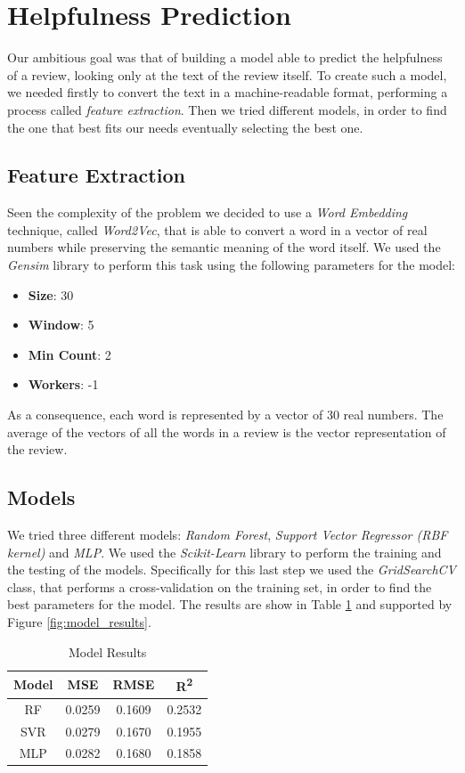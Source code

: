 \section{Helpfulness Prediction}
Our ambitious goal was that of building a model able to predict the helpfulness of a review, looking only at the text of the review itself.
To create such a model, we needed firstly to convert the text in a machine-readable format, performing a process called \textit{feature extraction}.
Then we tried different models, in order to find the one that best fits our needs eventually selecting the best one.

\subsection{Feature Extraction}
Seen the complexity of the problem we decided to use a \textit{Word Embedding} technique, called \textit{Word2Vec}, that is able to convert a word in a vector of real numbers
while preserving the semantic meaning of the word itself. We used the \textit{Gensim} library to perform this task using the following parameters for the model:
\begin{itemize}[noitemsep, leftmargin=*]
    \item \textbf{Size}: 30
    \item \textbf{Window}: 5
    \item \textbf{Min Count}: 2
    \item \textbf{Workers}: -1
\end{itemize}
As a consequence, each word is represented by a vector of 30 real numbers. The average of the vectors of all the words in a review is the vector representation of the review.

\subsection{Models}
We tried three different models: \textit{Random Forest}, \textit{Support Vector Regressor (RBF kernel)} and \textit{MLP}.
We used the \textit{Scikit-Learn} library to perform the training and the testing of the models. Specifically for this last step
we used the \textit{GridSearchCV} class, that performs a cross-validation on the training set, in order to find the best parameters for the model.
The results are show in Table \ref{tab:model_results} and supported by Figure \ref{fig:model_results}.

\begin{table}[H]
    \footnotesize
    \centering
    \caption{Model Results}
    \label{tab:model_results}
    \begin{tabular}{|c|c|c|c|}
        \hline
        Model & MSE & RMSE & R\textsuperscript{2} \\
        \hline
        RF & 0.0259 & 0.1609 & 0.2532 \\
        SVR & 0.0279 & 0.1670 & 0.1955 \\
        MLP & 0.0282 & 0.1680 & 0.1858 \\
        \hline
    \end{tabular}
\end{table}

